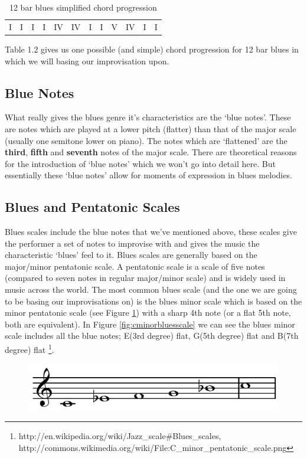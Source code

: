 \documentclass[pdftex,12pt,a4paper]{report}
\begin{document}
\begin{table}[here]
\centering
{}
\begin{tabular}{|*{12}{C|}}
  I & I & I & I & IV & IV & I & I & V & IV & I & I
\end{tabular}
\caption{12 bar blues simplified chord progression}
\label{12 bar blues}
\end{table}

Table 1.2 gives us one possible (and simple) chord progression for 12 bar blues in which we will basing our improvisation upon. 

\subsection{Blue Notes} What really gives the blues genre it's characteristics are the `blue notes'. These are notes which are played at a lower pitch (flatter) than that of the major scale (usually one semitone lower on piano). The notes which are `flattened' are the \textbf{third}, \textbf{fifth} and \textbf{seventh} notes of the major scale.
There are theoretical reasons for the introduction of `blue notes' which we won't go into detail here. But essentially these `blue notes' allow for moments of expression in blues melodies. 

\subsection{Blues and Pentatonic Scales}
Blues scales include the blue notes that we've mentioned above, these scales give the performer a set of notes to improvise with and gives the music the characteristic `blues' feel to it. Blues scales are generally based on the major/minor pentatonic scale. A pentatonic scale is a scale of five notes (compared to seven notes in regular major/minor scale) and is widely used in music across the world. The most common blues scale (and the one we are going to be basing our improvisations on) is the blues minor scale which is based on the minor pentatonic scale (see Figure \ref{fig:cminorpentatonicscale}) with a sharp 4th note (or a flat 5th note, both are equivalent). In Figure \ref{fig:cminorbluesscale} we can see the blues minor scale includes all the blue notes; E(3rd degree) flat, G(5th degree) flat and B(7th degree) flat \footnote{http://en.wikipedia.org/wiki/Jazz_scale\#Blues_scales, http://commons.wikimedia.org/wiki/File:C_minor_pentatonic_scale.png}.

\begin{figure}[here]
  \centering
  \includegraphics[scale=0.25]{figure/minorpentatonicscale.png}
  \label{fig:cminorpentatonicscale}
\end{figure}
\end{document}
